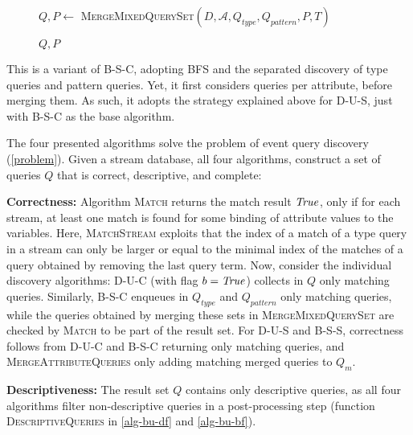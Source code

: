 \begin{figure}[t]
\begin{algorithm}[H]
{{        }
    	\label{alg6:while_pattern_end}
    }
    $Q,P \leftarrow$ \textsc{MergeMixedQuerySet}$({D}, \mathcal{A},
    Q_{\mathit{type}},
    Q_{\mathit{pattern}}, P, T)$\;
    
    {\Return $\mathit{Q,P}$}
\end{algorithm}
\vspace{-1em}
\end{figure}

This is a variant of B-S-C, adopting BFS and the separated
discovery of type queries and pattern queries. Yet, it first considers
queries per attribute, before merging them. As such, it
adopts the strategy explained above for D-U-S, just with B-S-C as the base
algorithm.



The four presented algorithms solve the problem of event query
discovery (\autoref{problem}). Given a stream database, all four
algorithms, construct a set of queries $Q$ that is
correct, descriptive, and complete:


\textbf{Correctness:} Algorithm \textsc{Match} returns the match result
$\mathit{True}$, only if for each stream, at least one match is found for some
binding of attribute values to the variables. Here, \textsc{MatchStream}
exploits that the index of a match of a type query in a stream can only be
larger or equal to the minimal index of the matches of a query obtained by
removing the last query term. Now, consider the individual discovery
algorithms: D-U-C (with flag $b=\mathit{True}$) collects in $Q$ only matching
queries. Similarly, B-S-C enqueues in $Q_{\mathit{type}}$ and
$Q_{\mathit{pattern}}$ only matching queries, while the queries obtained by
merging these sets in
\textsc{MergeMixedQuerySet} are checked by \textsc{Match} to
be part of the result set. For D-U-S and B-S-S, correctness follows from
D-U-C and B-S-C returning only matching queries, and
\textsc{MergeAttributeQueries} only adding matching merged queries to
$Q_m$.

\textbf{Descriptiveness:} The result set ${Q}$ contains only descriptive
queries, as all four
algorithms filter non-descriptive queries in a post-pro\-ces\-sing step
(function \textsc{DescriptiveQueries} in \autoref{alg-bu-df} and
\autoref{alg-bu-bf}).

